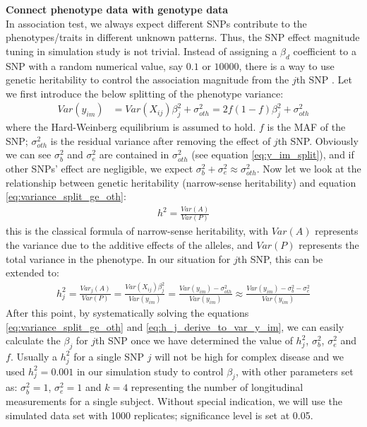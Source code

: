 \documentclass[12pt]{article}
\begin{document}
\textbf{Connect phenotype data with genotype data}\\
In association test, we always expect different SNPs contribute to the phenotypes/traits in different unknown patterns. Thus, the SNP effect magnitude tuning in simulation study is not trivial. Instead of assigning a $\beta_d$ coefficient to a SNP with a random numerical value, say $0.1$ or $10000$, there is a way to use genetic heritability to control the association magnitude from the $j$th SNP \cite{Lynch1998}. Let we first introduce the below splitting of the phenotype variance:
\begin{align}
Var(y_{im} ) & = Var(X_{ij}) \beta_j^2 + \sigma_{oth} ^ 2  = 2f(1-f) \beta_j^2 + \sigma_{oth}^2
\label{eq:variance_split_ge_oth}
\end{align}
where the Hard-Weinberg equilibrium is assumed to hold. $f$ is the MAF of the SNP; $\sigma_{oth}^2$ is the residual variance after removing the effect of $j$th SNP. Obviously we can see $\sigma_b^2$ and $\sigma_e^2$ are contained in $\sigma_{oth}^2$ (see equation \eqref{eq:y_im_split}), and if other SNPs' effect are negligible, we expect $\sigma_b^2 + \sigma_e^2 \approx \sigma_{oth}^2$. Now let we look at the relationship between genetic heritability (narrow-sense heritability) and equation \eqref{eq:variance_split_ge_oth}:
\begin{align}
h^2 = \frac{Var(A)}{Var(P)}
\end{align}
this is the classical formula of narrow-sense heritability, with $Var(A)$ represents the variance due to the additive effects of the alleles, and $Var(P)$ represents the total variance in the phenotype. In our situation for $j$th SNP, this can be extended to:
\begin{align}
h_j^2 = \frac{Var_j(A)}{Var(P)} = \frac{Var(X_{ij}) \beta_j^2 } {Var(y_{im} )} = \frac{Var(y_{im} ) - \sigma^2_{oth} } {Var(y_{im} )} \approx \frac{Var(y_{im} ) - \sigma_b^2 - \sigma_e^2 } {Var(y_{im} )}
\label{eq:h_j_derive_to_var_y_im}
\end{align}
After this point, by systematically solving the equations \eqref{eq:variance_split_ge_oth} and \eqref{eq:h_j_derive_to_var_y_im}, we can easily calculate the $\beta_j$ for $j$th SNP once we have determined the value of $h_j^2$, $\sigma_b^2$, $\sigma_e^2$ and $f$. Usually a $h_j^2$ for a single SNP $j$ will not be high for complex disease and we used $h_j^2 = 0.001$ in our simulation study to control $\beta_j$, with other parameters set as: $\sigma_b^2 = 1$, $\sigma_e^2 = 1$ and $k = 4$ representing the number of longitudinal measurements for a single subject. Without special indication, we will use the simulated data set with 1000 replicates; significance level is set at 0.05. \\ 
\end{document}
